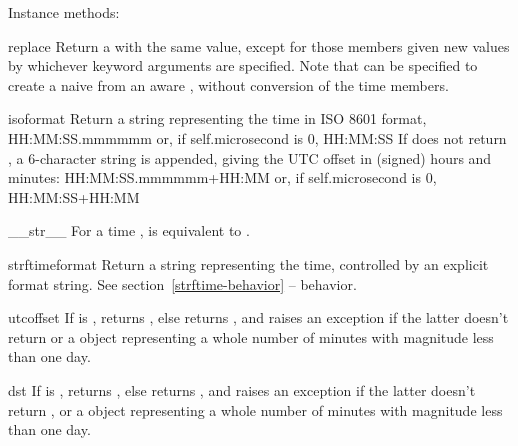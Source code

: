 Instance methods:

\begin{methoddesc}{replace}{}
  Return a  with the same value, except for those members given
  new values by whichever keyword arguments are specified.  Note that
   can be specified to create a naive  from
  an aware , without conversion of the time members.
\end{methoddesc}

\begin{methoddesc}{isoformat}{}
  Return a string representing the time in ISO 8601 format,
      HH:MM:SS.mmmmmm
  or, if self.microsecond is 0,
      HH:MM:SS
  If  does not return , a 6-character
  string is appended, giving the UTC offset in (signed) hours and
  minutes:
      HH:MM:SS.mmmmmm+HH:MM
  or, if self.microsecond is 0,
      HH:MM:SS+HH:MM
\end{methoddesc}

\begin{methoddesc}{__str__}{}
  For a time ,  is equivalent to
  .
\end{methoddesc}

\begin{methoddesc}{strftime}{format}
  Return a string representing the time, controlled by an explicit
  format string.  See section~\ref{strftime-behavior} --
   behavior.
\end{methoddesc}

\begin{methoddesc}{utcoffset}{}
  If  is , returns , else
  returns , and
  raises an exception if the latter doesn't return  or
  a  object representing a whole number of minutes
  with magnitude less than one day.
\end{methoddesc}

\begin{methoddesc}{dst}{}
  If  is , returns , else
  returns , and
  raises an exception if the latter doesn't return , or
  a  object representing a whole number of minutes
  with magnitude less than one day.
\end{methoddesc}

